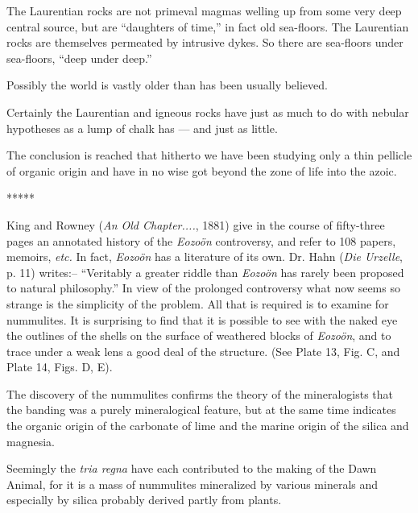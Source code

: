 \documentclass[a4paper, 12pt, oneside]{article}
\begin{document}
The Laurentian rocks are not primeval magmas welling up from some very deep central source, but are ``daughters of time,'' in fact old sea-floors. The Laurentian rocks are themselves permeated by intrusive dykes. So there are sea-floors under sea-floors, ``deep under deep.''

Possibly the world is vastly older than has been usually believed.

Certainly the Laurentian and igneous rocks have just as much to do with nebular hypotheses as a lump of chalk has --- and just as little.

The conclusion is reached that hitherto we have been studying only a thin pellicle of organic origin and have in no wise got beyond the zone of life into the azoic.

\centerline{*\hspace{15mm}*\hspace{15mm}*\hspace{15mm}*\hspace{15mm}*}
\bigskip

King and Rowney (\emph{An Old Chapter....}, 1881) give in the course of fifty-three pages an annotated history of the \emph{Eozoön} controversy, and refer to 108 papers, memoirs, \emph{etc.} In fact, \emph{Eozoön} has a literature of its own. Dr. Hahn (\emph{Die Urzelle}, p. 11) writes:-- ``Veritably a greater riddle than \emph{Eozoön} has rarely been proposed to natural philosophy.'' In view of the prolonged controversy what now seems so strange is the simplicity of the problem. All that is required is to examine for nummulites. It is surprising to find that it is possible to see with the naked eye the outlines of the shells on the surface of weathered blocks of \emph{Eozoön}, and to trace under a weak lens a good deal of the structure. (See Plate 13, Fig. C, and Plate 14, Figs. D, E).

The discovery of the nummulites confirms the theory of the mineralogists that the banding was a purely mineralogical feature, but at the same time indicates the organic origin of the carbonate of lime and the marine origin of the silica and magnesia.

Seemingly the \emph{tria regna} have each contributed to the making of the Dawn Animal, for it is a mass of nummulites mineralized by various minerals and especially by silica probably derived partly from plants.
\end{document}
